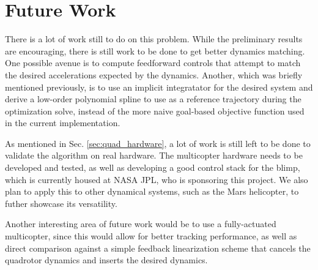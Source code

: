 \documentclass[../root.tex]{subfiles}
\begin{document}
\section{Future Work}
There is a lot of work still to do on this problem. While the preliminary 
results are encouraging, there is still work to be done to get better 
dynamics matching. One possible avenue is to compute feedforward controls 
that attempt to match the desired accelerations expected by the dynamics.
Another, which was briefly mentioned previously, is to use an implicit 
integratator for the desired system and derive a low-order polynomial 
spline to use as a reference trajectory during the optimization solve,
instead of the more naive goal-based objective function used in the 
current implementation.

As mentioned in Sec. \ref{sec:quad_hardware}, a lot of work is still left to
be done to validate the algorithm on real hardware. The multicopter hardware
needs to be developed and tested, as well as developing a good control stack
for the blimp, which is currently housed at NASA JPL, who is sponsoring this
project. We also plan to apply this to other dynamical systems, such as the
Mars helicopter, to futher showcase its versatility.

Another interesting area of future work would be to use a fully-actuated
multicopter, since this would allow for better tracking performance, as well
as direct comparison against a simple feedback linearization scheme that
cancels the quadrotor dynamics and inserts the desired dynamics.
\end{document}
